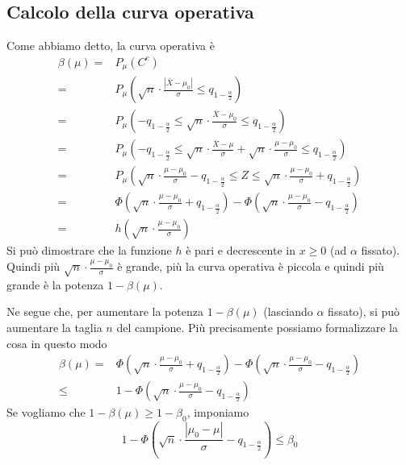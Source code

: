\subsection{Calcolo della curva operativa}
Come abbiamo detto, la curva operativa è
\begin{align*}
	\beta (\mu) = & P_\mu (C^c)                                                              \\
	=             & P_\mu \left( \sqrt{n} \cdot \frac{|\overline{X} - \mu_0|}{\sigma}
	\leq q_{1 - \frac{\alpha}{2}} \right)                                                    \\
	=             & P_\mu \left( -q_{1-\frac{\alpha}{2}} \leq
	\sqrt{n} \cdot \frac{\overline{X} - \mu_0}{\sigma} \leq q_{1 - \frac{\alpha}{2}} \right) \\
	=             & P_\mu \left( -q_{1-\frac{\alpha}{2}} \leq
	\sqrt{n} \cdot \frac{\overline{X} - \mu}{\sigma} + \sqrt{n} \cdot \frac{\mu - \mu_0}{\sigma}
	\leq q_{1-\frac{\alpha}{2}} \right)                                                      \\
	=             & P_\mu \left( \sqrt{n} \cdot \frac{\mu - \mu_0}{\sigma} -
	q_{1 - \frac{\alpha}{2}} \leq Z \leq
	\sqrt{n} \cdot \frac{\mu - \mu_0}{\sigma} + q_{1-\frac{\alpha}{2}} \right)               \\
	=             & \Phi \left( \sqrt{n} \cdot \frac{\mu - \mu_0}{\sigma} +
	q_{1-\frac{\alpha}{2}} \right) - \Phi \left( \sqrt{n} \cdot
	\frac{\mu - \mu_0}{\sigma} - q_{1-\frac{\alpha}{2}} \right)                              \\
	=             & h \left( \sqrt{n} \cdot \frac{\mu - \mu_0}{\sigma} \right)
\end{align*}
Si può dimostrare che la funzione $h$ è pari e decrescente in $x \geq 0$ (ad $\alpha$ fissato).
Quindi più $\sqrt{n} \cdot \frac{\mu - \mu_0}{\sigma}$ è grande, più la curva operativa è piccola
e quindi più grande è la potenza $1 - \beta(\mu)$.

Ne segue che, per aumentare la potenza $1 - \beta(\mu)$ (lasciando $\alpha$ fissato), si può
aumentare la taglia $n$ del campione. Più precisamente possiamo formalizzare la cosa in questo modo
\begin{align*}
	\beta (\mu) = & \Phi \left( \sqrt{n} \cdot \frac{\mu - \mu_0}{\sigma} +
	q_{1-\frac{\alpha}{2}} \right) - \Phi \left( \sqrt{n} \cdot
	\frac{\mu - \mu_0}{\sigma} - q_{1-\frac{\alpha}{2}} \right)                 \\
	\leq          & 1 - \Phi \left( \sqrt{n} \cdot \frac{\mu - \mu_0}{\sigma} -
	q_{1-\frac{\alpha}{2}} \right)
\end{align*}
Se vogliamo che $1-\beta(\mu) \geq 1 - \beta_0$, imponiamo
\[
	1 - \Phi \left( \sqrt{n} \cdot \frac{|\mu_0 - \mu|}{\sigma} -
	q_{1-\frac{\alpha}{2}} \right) \leq \beta_0
\]

